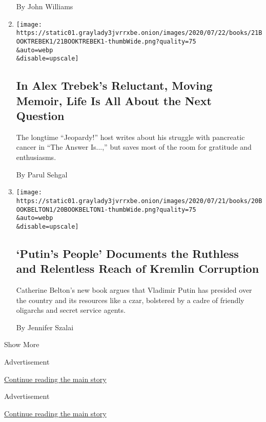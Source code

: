 \begin{enumerate}
  By John Williams
\item
  \href{/2020/07/21/books/review-answer-is-alex-trebek-jeopardy-memoir.html}{}

  \texttt{[image: https://static01.graylady3jvrrxbe.onion/images/2020/07/22/books/21BOOKTREBEK1/21BOOKTREBEK1-thumbWide.png?quality=75\\\&auto=webp\\\&disable=upscale]}

  \hypertarget{in-alex-trebeks-reluctant-moving-memoir-life-is-all-about-the-next-question}{%
  \subsection{In Alex Trebek's Reluctant, Moving Memoir, Life Is All
  About the Next
  Question}\label{in-alex-trebeks-reluctant-moving-memoir-life-is-all-about-the-next-question}}

  The longtime ``Jeopardy!'' host writes about his struggle with
  pancreatic cancer in ``The Answer Is...,'' but saves most of the room
  for gratitude and enthusiasms.

  By Parul Sehgal
\item
  \href{/2020/07/16/books/review-putins-people-kgb-catherine-belton.html}{}

  \texttt{[image: https://static01.graylady3jvrrxbe.onion/images/2020/07/21/books/20BOOKBELTON1/20BOOKBELTON1-thumbWide.png?quality=75\\\&auto=webp\\\&disable=upscale]}

  \hypertarget{putins-people-documents-the-ruthless-and-relentless-reach-of-kremlin-corruption}{%
  \subsection{`Putin's People' Documents the Ruthless and Relentless
  Reach of Kremlin
  Corruption}\label{putins-people-documents-the-ruthless-and-relentless-reach-of-kremlin-corruption}}

  Catherine Belton's new book argues that Vladimir Putin has presided
  over the country and its resources like a czar, bolstered by a cadre
  of friendly oligarchs and secret service agents.

  By Jennifer Szalai
\end{enumerate}

Show More

Advertisement

\protect\hyperlink{after-mid1}{Continue reading the main story}

Advertisement

\protect\hyperlink{after-mktg}{Continue reading the main story}

